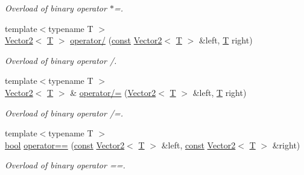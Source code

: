\begin{DoxyCompactItemize}
\begin{DoxyCompactList}\small\item\em Overload of binary operator $\ast$=. \end{DoxyCompactList}\item 
{\footnotesize template$<$typename T $>$ }\\\hyperlink{classsf_1_1_vector2}{Vector2}$<$ \hyperlink{curses_8priv_8h_a5ef253115820acf7d27f3c5c3b02a0f0}{T} $>$ \hyperlink{classsf_1_1_vector2_a7409dd89cb3aad6c3bc6622311107311}{operator/} (\hyperlink{term__entry_8h_a57bd63ce7f9a353488880e3de6692d5a}{const} \hyperlink{classsf_1_1_vector2}{Vector2}$<$ \hyperlink{curses_8priv_8h_a5ef253115820acf7d27f3c5c3b02a0f0}{T} $>$ \&left, \hyperlink{curses_8priv_8h_a5ef253115820acf7d27f3c5c3b02a0f0}{T} right)
\begin{DoxyCompactList}\small\item\em Overload of binary operator /. \end{DoxyCompactList}\item 
{\footnotesize template$<$typename T $>$ }\\\hyperlink{classsf_1_1_vector2}{Vector2}$<$ \hyperlink{curses_8priv_8h_a5ef253115820acf7d27f3c5c3b02a0f0}{T} $>$ \& \hyperlink{classsf_1_1_vector2_ac4d293c9dc7954ccfd5e373972f38b03}{operator/=} (\hyperlink{classsf_1_1_vector2}{Vector2}$<$ \hyperlink{curses_8priv_8h_a5ef253115820acf7d27f3c5c3b02a0f0}{T} $>$ \&left, \hyperlink{curses_8priv_8h_a5ef253115820acf7d27f3c5c3b02a0f0}{T} right)
\begin{DoxyCompactList}\small\item\em Overload of binary operator /=. \end{DoxyCompactList}\item 
{\footnotesize template$<$typename T $>$ }\\\hyperlink{term__entry_8h_a002004ba5d663f149f6c38064926abac}{bool} \hyperlink{classsf_1_1_vector2_a9a7b2d36c3850828fdb651facfd25136}{operator==} (\hyperlink{term__entry_8h_a57bd63ce7f9a353488880e3de6692d5a}{const} \hyperlink{classsf_1_1_vector2}{Vector2}$<$ \hyperlink{curses_8priv_8h_a5ef253115820acf7d27f3c5c3b02a0f0}{T} $>$ \&left, \hyperlink{term__entry_8h_a57bd63ce7f9a353488880e3de6692d5a}{const} \hyperlink{classsf_1_1_vector2}{Vector2}$<$ \hyperlink{curses_8priv_8h_a5ef253115820acf7d27f3c5c3b02a0f0}{T} $>$ \&right)
\begin{DoxyCompactList}\small\item\em Overload of binary operator ==. \end{DoxyCompactList}\item 

\end{DoxyCompactItemize}
